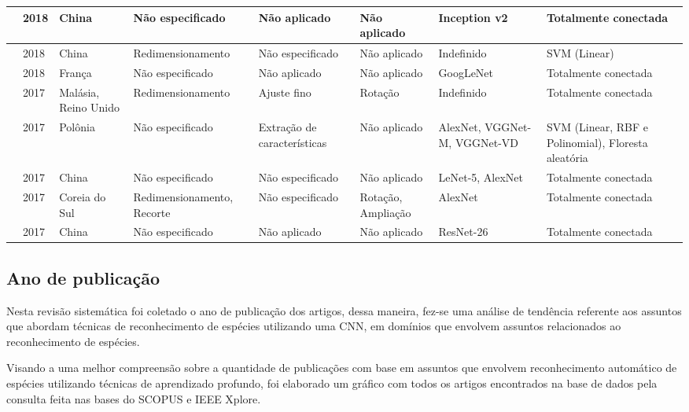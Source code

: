 \documentclass[
	12pt,				%
	oneside,			%
	a4paper,			%
	english,			%
	brazil				%
	]{abntex2ppgsi}
\begin{document}
\begin{landscape}
\begin{OnehalfSpacing}
\begin{footnotesize}
\begin{longtable}{|p{2.3cm}|p{1.3cm}|p{1.8cm}|p{3cm}|p{2.4cm}|p{4.3cm}|p{4.3cm}|p{2.5cm}|}
\cite{zhu2018method} &
  2018 &
  China &
  Não especificado &
  Não aplicado &
  Não aplicado &
  Inception v2 &
  Totalmente conectada \\ \hline
\cite{zhu2018plant} &
  2018 &
  China &
  Redimensionamento &
  Não especificado &
  Não aplicado &
  Indefinido &
  SVM (Linear) \\ \hline
\cite{villon2018deep} &
  2018 &
  França &
  Não especificado &
  Não aplicado &
  Não aplicado &
  GoogLeNet &
  Totalmente conectada \\ \hline
\cite{lee2017deep} &
  2017 &
  Malásia, Reino Unido &
  Redimensionamento &
  Ajuste fino &
  Rotação &
  Indefinido &
  Totalmente conectada \\ \hline
\cite{zielinski2017deep} &
  2017 &
  Polônia &
  Não especificado &
  Extração de características &
  Não aplicado &
  AlexNet, VGGNet-M, VGGNet-VD &
  SVM (Linear, RBF e Polinomial), Floresta aleatória \\ \hline
\cite{wang2017crop} &
  2017 &
  China &
  Não especificado &
  Não especificado &
  Não aplicado &
  LeNet-5, AlexNet &
  Totalmente conectada \\ \hline
\cite{lim2017performance} &
  2017 &
  Coreia do Sul &
  Redimensionamento, Recorte &
  Não especificado &
  Rotação, Ampliação &
  AlexNet &
  Totalmente conectada \\ \hline
\cite{sun2017deep} &
  2017 &
  China &
  Não especificado &
  Não aplicado &
  Não aplicado &
  ResNet-26 &
  Totalmente conectada \\ \hline
 
\end{longtable}
\end{footnotesize}
\end{OnehalfSpacing}
\end{landscape}

\subsection{Ano de publicação}
Nesta revisão sistemática foi coletado o ano de publicação dos artigos, dessa maneira, fez-se  uma análise de tendência referente aos assuntos que abordam técnicas de reconhecimento de espécies utilizando uma CNN, em domínios que envolvem assuntos relacionados ao reconhecimento de espécies.

Visando a uma melhor compreensão sobre a quantidade de publicações com base em assuntos que envolvem reconhecimento automático de espécies utilizando técnicas de aprendizado profundo, foi elaborado um gráfico com todos os artigos encontrados na base de dados pela consulta feita nas bases do SCOPUS e IEEE Xplore. 
\end{document}
